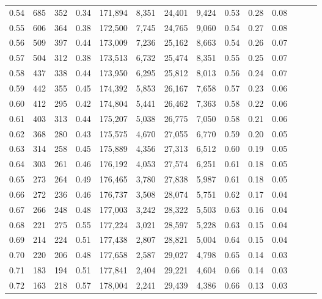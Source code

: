 \begin{tabular}{rrrrrrrrrrrrrr}
0.54 &    685 &  352 &  0.34 &  171,894 &    8,351 &  24,401 &   9,424 &  0.53 &  0.28 &      0.08 \\
0.55 &    606 &  364 &  0.38 &  172,500 &    7,745 &  24,765 &   9,060 &  0.54 &  0.27 &      0.08 \\
0.56 &    509 &  397 &  0.44 &  173,009 &    7,236 &  25,162 &   8,663 &  0.54 &  0.26 &      0.07 \\
0.57 &    504 &  312 &  0.38 &  173,513 &    6,732 &  25,474 &   8,351 &  0.55 &  0.25 &      0.07 \\
0.58 &    437 &  338 &  0.44 &  173,950 &    6,295 &  25,812 &   8,013 &  0.56 &  0.24 &      0.07 \\
0.59 &    442 &  355 &  0.45 &  174,392 &    5,853 &  26,167 &   7,658 &  0.57 &  0.23 &      0.06 \\
0.60 &    412 &  295 &  0.42 &  174,804 &    5,441 &  26,462 &   7,363 &  0.58 &  0.22 &      0.06 \\
0.61 &    403 &  313 &  0.44 &  175,207 &    5,038 &  26,775 &   7,050 &  0.58 &  0.21 &      0.06 \\
0.62 &    368 &  280 &  0.43 &  175,575 &    4,670 &  27,055 &   6,770 &  0.59 &  0.20 &      0.05 \\
0.63 &    314 &  258 &  0.45 &  175,889 &    4,356 &  27,313 &   6,512 &  0.60 &  0.19 &      0.05 \\
0.64 &    303 &  261 &  0.46 &  176,192 &    4,053 &  27,574 &   6,251 &  0.61 &  0.18 &      0.05 \\
0.65 &    273 &  264 &  0.49 &  176,465 &    3,780 &  27,838 &   5,987 &  0.61 &  0.18 &      0.05 \\
0.66 &    272 &  236 &  0.46 &  176,737 &    3,508 &  28,074 &   5,751 &  0.62 &  0.17 &      0.04 \\
0.67 &    266 &  248 &  0.48 &  177,003 &    3,242 &  28,322 &   5,503 &  0.63 &  0.16 &      0.04 \\
0.68 &    221 &  275 &  0.55 &  177,224 &    3,021 &  28,597 &   5,228 &  0.63 &  0.15 &      0.04 \\
0.69 &    214 &  224 &  0.51 &  177,438 &    2,807 &  28,821 &   5,004 &  0.64 &  0.15 &      0.04 \\
0.70 &    220 &  206 &  0.48 &  177,658 &    2,587 &  29,027 &   4,798 &  0.65 &  0.14 &      0.03 \\
0.71 &    183 &  194 &  0.51 &  177,841 &    2,404 &  29,221 &   4,604 &  0.66 &  0.14 &      0.03 \\
0.72 &    163 &  218 &  0.57 &  178,004 &    2,241 &  29,439 &   4,386 &  0.66 &  0.13 &      0.03 \\

\end{tabular}
